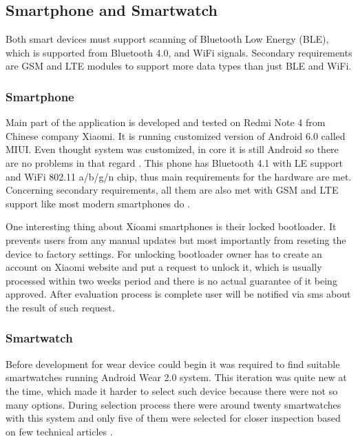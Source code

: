 \subsection{Smartphone and Smartwatch}\label{subsec:SmartphoneAndSmartWatch}
Both smart devices must support scanning of Bluetooth Low Energy (BLE), which is supported from Bluetooth 4.0, and WiFi signals. Secondary requirements are GSM and LTE modules to support more data types than just BLE and WiFi.

\subsubsection{Smartphone}\label{subsubsec:Smartphone}
Main part of the application is developed and tested on Redmi Note 4 from Chinese company Xiaomi. It is running customized version of Android 6.0 called MIUI. Even thought system was customized, in core it is still Android so there are no problems in that regard \cite{XRN4LTE}. This phone has Bluetooth 4.1 with LE support and WiFi 802.11 a/b/g/n chip, thus main requirements for the hardware are met. Concerning secondary requirements, all them are also met with GSM and LTE support like most modern smartphones do \cite{XRN4FPS}.

One interesting thing about Xioami smartphones is their locked bootloader. It prevents users from any manual updates but most importantly from reseting the device to factory settings. For unlocking bootloader owner has to create an account on Xiaomi website and put a request to unlock it, which is usually processed within two weeks period and there is no actual guarantee of it being approved. After evaluation process is complete user will be notified via sms about the result of such request.

\subsubsection{Smartwatch}\label{subsubsec:Smartwatch}
Before development for wear device could begin it was required to find suitable smartwatches running Android Wear 2.0 system. This iteration was quite new at the time, which made it harder to select such device because there were not so many options. During selection process there were around twenty smartwatches with this system and only five of them were selected for closer inspection based on few technical articles \cite{BAWW, BAWW18, BAWW17}.

